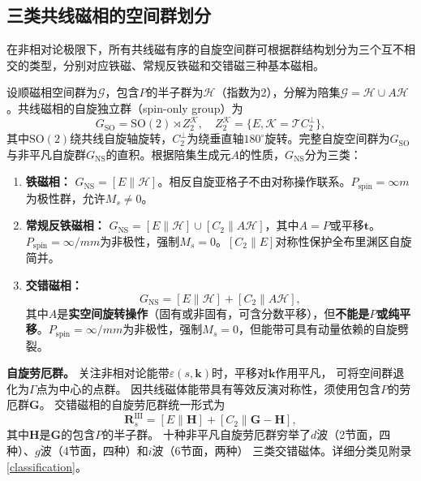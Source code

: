 \subsection{三类共线磁相的空间群划分}

在非相对论极限下，所有共线磁有序的自旋空间群可根据群结构划分为三个互不相交的类型，分别对应铁磁、常规反铁磁和交错磁三种基本磁相\cite{Smejkal2022PRX,liu_symmetry_2026,jungwirth_symmetry_2026}。

设顺磁相空间群为$\mathcal{G}$，包含$P$的半子群为$\mathcal{H}$（指数为2），分解为陪集$\mathcal{G} = \mathcal{H} \cup A\mathcal{H}$。共线磁相的自旋独立群（spin-only group）为
\begin{equation}
G_{\mathrm{SO}} = \mathrm{SO}(2) \rtimes Z_2^{\mathcal{K}},\quad Z_2^{\mathcal{K}} = \{E, \mathcal{K}=\mathcal{T}C_{2}^{\perp}\},
\end{equation}
其中$\mathrm{SO}(2)$绕共线自旋轴旋转，$C_{2}^{\perp}$为绕垂直轴$180^\circ$旋转。完整自旋空间群为$G_{\mathrm{SO}}$与非平凡自旋群$G_{\mathrm{NS}}$的直积。根据陪集生成元$A$的性质，$G_{\mathrm{NS}}$分为三类\cite{Smejkal2022PRX}：

\begin{enumerate}
\item \textbf{铁磁相：} $G_{\mathrm{NS}} = [E\|\mathcal{H}]$。相反自旋亚格子不由对称操作联系。$P_{\mathrm{spin}}=\infty m$为极性群，允许$M_s\neq0$。

\item \textbf{常规反铁磁相：} $G_{\mathrm{NS}} = [E\|\mathcal{H}] \cup [C_2\|A\mathcal{H}]$，其中$A=P$或平移$\mathbf{t}$。$P_{\mathrm{spin}}=\infty/mm$为非极性，强制$M_s=0$。$[C_2\|E]$对称性保护全布里渊区自旋简并。

\item \textbf{交错磁相：} 
\begin{equation}
G_{\mathrm{NS}} = [E\|\mathcal{H}] + [C_2\|A\mathcal{H}],
\label{eq:altermag_SSG}
\end{equation}
其中$A$是\textbf{实空间旋转操作}（固有或非固有，可含分数平移），但\textbf{不能是$P$或纯平移}\cite{Smejkal2022PRX,jungwirth_symmetry_2026}。$P_{\mathrm{spin}}=\infty/mm$为非极性，强制$M_s=0$，但能带可具有动量依赖的自旋劈裂。
\end{enumerate}

\noindent\textbf{自旋劳厄群。}
关注非相对论能带$\varepsilon(s,\mathbf{k})$时，平移对$\mathbf{k}$作用平凡，
可将空间群退化为$\Gamma$点为中心的点群。
因共线磁体能带具有等效反演对称性，须使用包含$P$的劳厄群$\mathbf{G}$。
交错磁相的自旋劳厄群统一形式为
\begin{equation}
\mathbf{R}_s^{\mathrm{III}} = [E\|\mathbf{H}] + [C_2\|\mathbf{G}-\mathbf{H}],
\label{eq:altermag_Laue}
\end{equation}
其中$\mathbf{H}$是$\mathbf{G}$的包含$P$的半子群。
十种非平凡自旋劳厄群穷举了$d$波（2节面，四种）、$g$波（4节面，四种）和$i$波（6节面，两种）
三类交错磁体\cite{jungwirth_symmetry_2026}。详细分类见附录\autoref{classification}。

